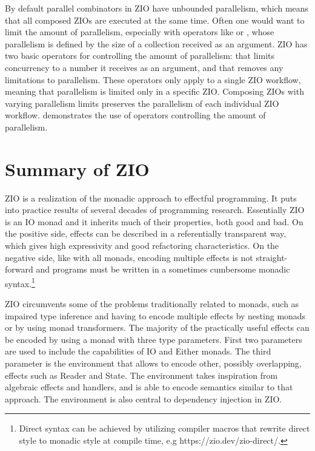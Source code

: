 

By default parallel combinators in ZIO have unbounded parallelism, which means that all composed ZIOs are executed at the same time. Often one would want to limit the amount of parallelism, especially with operators like  or , whose parallelism is defined by the size of a collection received as an argument. ZIO has two basic operators for controlling the amount of parallelism:  that limits concurrency to a number it receives as an argument, and  that removes any limitations to parallelism. These operators only apply to a single ZIO workflow, meaning that parallelism is limited only in a specific ZIO. Composing ZIOs with varying parallelism limits preserves the parallelism of each individual ZIO workflow.  demonstrates the use of operators controlling the amount of parallelism.




\section{Summary of ZIO}

ZIO is a realization of the monadic approach to effectful programming. It puts into practice results of several decades of programming research. Essentially ZIO is an IO monad and it inherits much of their properties, both good and bad. On the positive side, effects can be described in a referentially transparent way, which gives high expressivity and good refactoring characteristics. On the negative side, like with all monads, encoding multiple effects is not straight-forward and programs must be written in a sometimes cumbersome monadic syntax.\footnote{Direct syntax can be achieved by utilizing compiler macros that rewrite direct style to monadic style at compile time, e.g https://zio.dev/zio-direct/.}

ZIO circumvents some of the problems traditionally related to monads, such as impaired type inference and having to encode multiple effects by nesting monads or by using monad transformers. The majority of the practically useful effects can be encoded by using a monad with three type parameters. First two parameters are used to include the capabilities of IO and Either monads. The third parameter is the environment that allows to encode other, possibly overlapping, effects such as Reader and State. The environment takes inspiration from algebraic effects and handlers, and is able to encode semantics similar to that approach. The environment is also central to dependency injection in ZIO.

